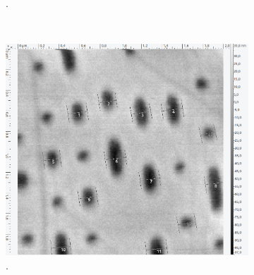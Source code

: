 \begin{figure}[H]
\begin{subfigure}[t]{0.3\textwidth}
	\caption{.}
	\label{abb:}
	\end{subfigure}
	~
	\begin{subfigure}[t]{0.3\textwidth}
	\includegraphics[width=\textwidth]{AFM_auswertung/bluray_tiefe.png}
	\caption{.}
	\label{abb:}
	\end{subfigure}
	\\
	\begin{subfigure}[t]{0.3\textwidth}

\end{subfigure}
\end{figure}
